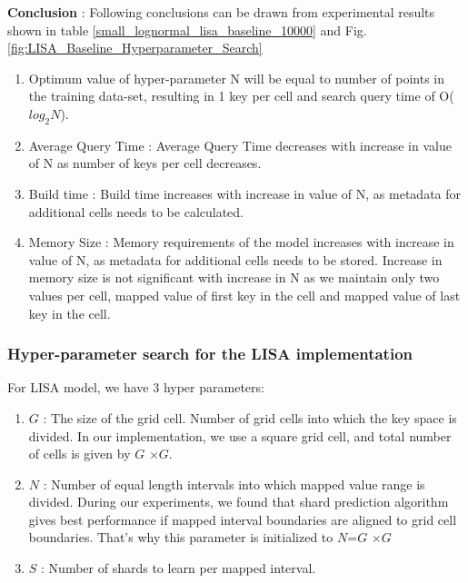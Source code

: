 \textbf{Conclusion} : Following conclusions can be drawn from experimental results shown in table \ref{small_lognormal_lisa_baseline_10000} and Fig. \ref{fig:LISA_Baseline_Hyperparameter_Search}
\begin{enumerate}
    \item Optimum value of hyper-parameter N will be equal to number of points in the training data-set, resulting in 1 key per cell and search query time of O($log_{2}N$).
	
	\item Average Query Time :  Average Query Time decreases with increase in value of N as number of keys per cell decreases.
	\item Build time : Build time increases with increase in value of N, as metadata for additional cells needs to be calculated. 
	\item Memory Size :  Memory requirements of the model increases with increase in value of N, as metadata for additional cells needs to be stored. Increase  in memory size is not significant with increase in N as we maintain only two values per cell, mapped value of first key in the cell and mapped value of last key in the cell.
\end{enumerate}



\subsubsection {Hyper-parameter search for the LISA implementation}
For LISA model, we have 3 hyper parameters:
\begin{enumerate}
	\item $G$ : The size of the grid cell. Number of grid cells into which the key space is divided. In our implementation, we use a square grid cell, and total number of cells is given by $G$ $\times G$.
	\item $N$ : Number of equal length intervals into which mapped value range is divided. During our experiments, we found that shard prediction algorithm gives best performance if mapped interval boundaries are aligned to grid cell boundaries. That's why this parameter is initialized to $N$=$G$ $\times G$   
	\item $S$ : Number of shards to learn per mapped interval. 
\end{enumerate}

